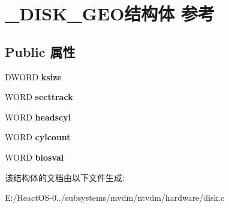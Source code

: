 \hypertarget{struct___d_i_s_k___g_e_o}{}\section{\+\_\+\+D\+I\+S\+K\+\_\+\+G\+E\+O结构体 参考}
\label{struct___d_i_s_k___g_e_o}
\subsection*{Public 属性}
\begin{DoxyCompactItemize}
\item 
\mbox{\label{struct___d_i_s_k___g_e_o_a3327e2770e2cdf6baa9773b6b9095985}} 
D\+W\+O\+RD {\bfseries ksize}
\item 
\mbox{\label{struct___d_i_s_k___g_e_o_a659db0cadb228dcebfc3b6dd93b78383}} 
W\+O\+RD {\bfseries secttrack}
\item 
\mbox{\label{struct___d_i_s_k___g_e_o_a748b29a98b3cf248d5f354068c6dd53e}} 
W\+O\+RD {\bfseries headscyl}
\item 
\mbox{\label{struct___d_i_s_k___g_e_o_a9727d169ab6bf277fabfec1bde3e6b95}} 
W\+O\+RD {\bfseries cylcount}
\item 
\mbox{\label{struct___d_i_s_k___g_e_o_aa0de9f569ff0bbb538892e5feb840a46}} 
W\+O\+RD {\bfseries biosval}
\end{DoxyCompactItemize}


该结构体的文档由以下文件生成\+:\begin{DoxyCompactItemize}
\item 
E\+:/\+React\+O\+S-\/0../subsystems/mvdm/ntvdm/hardware/disk.\+c\end{DoxyCompactItemize}
